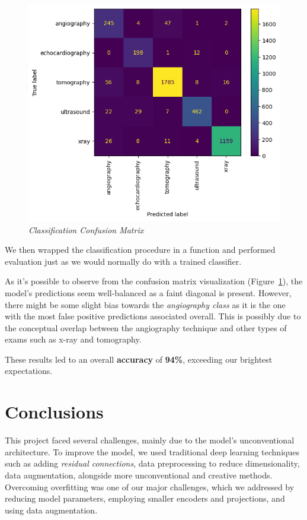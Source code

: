 \documentclass[10pt,twocolumn,letterpaper]{article}
\begin{document}
\begin{figure}[h]
   \centering
   \includegraphics[width=0.7\linewidth]{img/Classification_Result.png}
   \caption{\textit{Classification Confusion Matrix}}
   \label{fig:clasres}
\end{figure}

We then wrapped the classification procedure in a function and performed evaluation just as we would normally do with a trained classifier.

As it's possible to observe from the confusion matrix visualization (Figure\ \ref{fig:clasres}), the model's predictions seem well-balanced as a faint diagonal is present.
However, there might be some slight bias towards the \textit{angiography class} as it is the one with the most false positive predictions associated overall.
This is possibly due to the conceptual overlap between the angiography technique and other types of exams such as x-ray and tomography.

These results led to an overall \textbf{accuracy} of \textbf{94\%}, exceeding our brightest expectations.


\section{Conclusions}

This project faced several challenges, mainly due to the model's unconventional architecture. 
To improve the model, we used traditional deep learning techniques such as adding \textit{residual connections}, data preprocessing to reduce dimensionality, data augmentation, alongside more unconventional and creative methods. Overcoming overfitting was one of our major challenges, which we addressed by reducing model parameters, employing smaller encoders and projections, and using data augmentation. 
\end{document}
